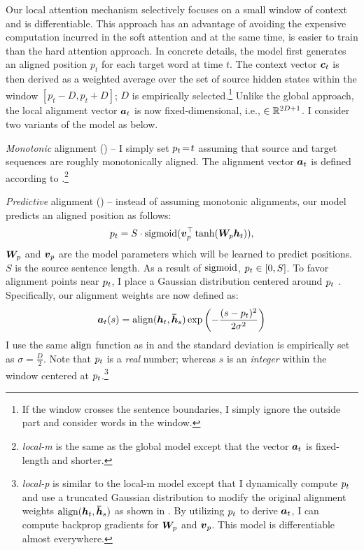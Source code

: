 Our local attention mechanism selectively focuses on a small window of
context and is differentiable. This approach has an advantage of avoiding the expensive computation incurred in
the soft attention and at the same time, is easier to train than the hard
attention approach.
In concrete details, the model first generates an aligned position $p_t$ for each target word at time $t$. The
context vector $\mbox{\boldmath{$c$}}_{t}$ is then derived as a weighted average over the set of source hidden states within the window $[p_t-D, p_t+D]$; $D$ is
empirically selected.\footnote{If the window crosses the sentence boundaries, I
simply ignore the outside part and consider words in the window.} Unlike the global approach, the local alignment vector $\mbox{\boldmath{$a$}}_{t}$ is now fixed-dimensional, i.e., $\in \mathbb{R}^{2D+1}$. %
I consider two variants of the model as below.

\textit{Monotonic} alignment ({\bf \localm{}}) -- I simply set %
$p_{t}\!=\!t$ assuming that source and target sequences are roughly
monotonically aligned. The alignment vector $\mbox{\boldmath{$a$}}_{t}$ is defined according to
.\footnote{{\it local-m} is the same as
the global model except that the vector $\mbox{\boldmath{$a$}}_{t}$ is
fixed-length and shorter.} %

\textit{Predictive} alignment ({\bf \localp{}}) --  %
instead of assuming monotonic alignments, our model predicts an aligned position as follows:
\begin{equation}
p_{t} = S \cdot \operatorname{sigmoid}(\mbox{\boldmath{$v$}}_p^\top\tanh(\bm{W}_{p}\mbox{\boldmath{$h$}}_{t})),
\label{e:p}
\end{equation}
$\bm{W}_{p}$ and $\mbox{\boldmath{$v$}}_p$ are the model parameters which will be learned
to predict positions. $S$ is the source sentence length. As a result of $\operatorname{sigmoid}$, $p_{t}
\in [0, S]$. To favor alignment points near $p_{t}$, I place a Gaussian distribution centered around $p_{t}$ . Specifically, our alignment weights are now
defined as:
\begin{equation}
\mbox{\boldmath{$a$}}_{t}(s) = \operatorname{align}(\mbox{\boldmath{$h$}}_{t}, \mbox{\boldmath{$\bar{h}$}}_{s}) \exp \left(-\frac{(s-p_{t})^2}{2\sigma^2}\right) 
\label{e:align_p}
\end{equation}
I use the same $\operatorname{align}$ function as in
 and the standard deviation is empirically set as
$\sigma\!=\!\frac{D}{2}$. Note that $p_{t}$ is a {\it real} number; whereas $s$
is an {\it integer} within the window centered at $p_{t}$.\footnote{{\it local-p} is similar to the
local-m model except that I dynamically
compute $p_{t}$ and use a truncated Gaussian distribution to modify the original alignment
weights $\operatorname{align}(\mbox{\boldmath{$h$}}_{t}, \mbox{\boldmath{$\bar{h}$}}_{s})$ as shown in . By utilizing $p_{t}$
to derive $\mbox{\boldmath{$a$}}_{t}$, I can compute backprop gradients for $\bm{W}_{p}$ and $\mbox{\boldmath{$v$}}_p$.
This model is differentiable almost everywhere.} 

